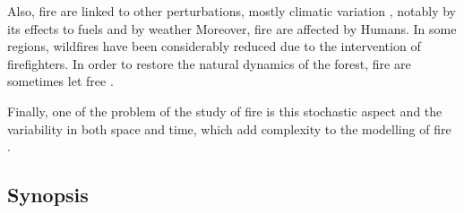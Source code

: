 \documentclass{article}
\begin{document}
Also, fire are linked to other perturbations, mostly climatic variation \cite{mckenzie_climatic_2004}\cite{da2018dynamics}, notably by its effects to fuels \cite{schoennagel_interaction_2004} and by weather \cite{fernandes_fire-smart_2013} 
Moreover, fire are affected by Humans. In some regions, wildfires have been considerably reduced due to the intervention of firefighters. In order to restore the natural dynamics of the forest, fire are sometimes let free \cite{wallenius2011major}. 

Finally, one of the problem of the study of fire is this stochastic aspect and the variability in both space and time, which add complexity to the modelling of fire  \cite{agee1998landscape} \cite{lertzman1998three}.









\subsection*{Synopsis}
\end{document}
